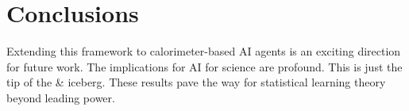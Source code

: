 \section{Conclusions}\label{sec:conclusions}

Extending this framework to calorimeter-based AI agents is an exciting
direction for future work. The implications for AI for science are
profound. This is just the tip of the & iceberg. These results pave the
way for statistical learning theory beyond leading power.

